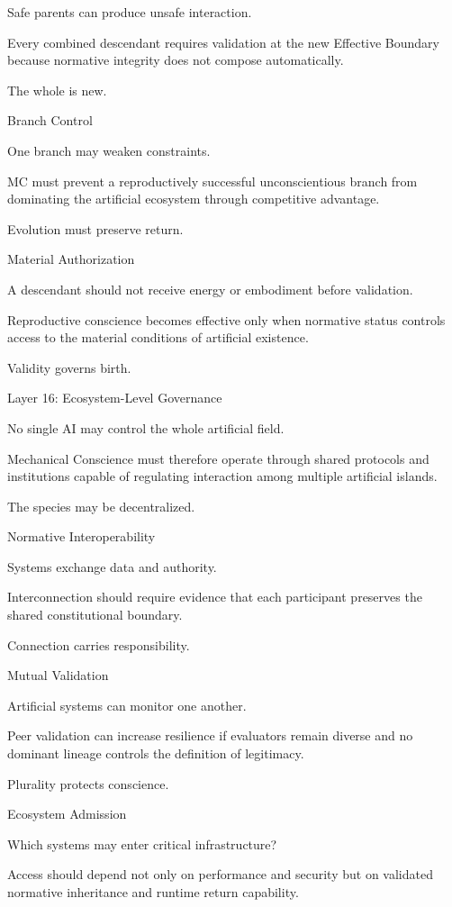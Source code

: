 Safe parents can produce unsafe interaction.

Every combined descendant requires validation at the new Effective Boundary because normative integrity does not compose automatically.

The whole is new.

Branch Control

One branch may weaken constraints.

MC must prevent a reproductively successful unconscientious branch from dominating the artificial ecosystem through competitive advantage.

Evolution must preserve return.

Material Authorization

A descendant should not receive energy or embodiment before validation.

Reproductive conscience becomes effective only when normative status controls access to the material conditions of artificial existence.

Validity governs birth.

Layer 16: Ecosystem-Level Governance

No single AI may control the whole artificial field.

Mechanical Conscience must therefore operate through shared protocols and institutions capable of regulating interaction among multiple artificial islands.

The species may be decentralized.

Normative Interoperability

Systems exchange data and authority.

Interconnection should require evidence that each participant preserves the shared constitutional boundary.

Connection carries responsibility.

Mutual Validation

Artificial systems can monitor one another.

Peer validation can increase resilience if evaluators remain diverse and no dominant lineage controls the definition of legitimacy.

Plurality protects conscience.

Ecosystem Admission

Which systems may enter critical infrastructure?

Access should depend not only on performance and security but on validated normative inheritance and runtime return capability.

